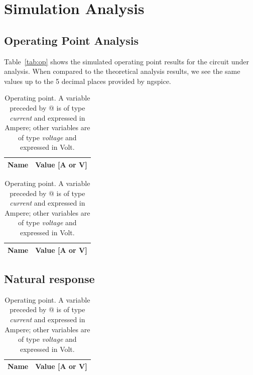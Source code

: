 \section{Simulation Analysis}
\label{sec:simulation}

\subsection{Operating Point Analysis}

Table~\ref{tab:op} shows the simulated operating point results for the circuit
under analysis. When compared to the theoretical analysis results, we see the same values
up to the 5 decimal places provided by ngspice.

\begin{table}[H]
  \centering
  \begin{tabular}{|l|r|}
    \hline    
    {\bf Name} & {\bf Value [A or V]} \\ \hline
    
  \end{tabular}
  \caption{Operating point. A variable preceded by @ is of type {\em current}
    and expressed in Ampere; other variables are of type {\it voltage} and expressed in
    Volt.}
  \label{tab:p1}
\end{table}

\begin{table}[H]
    \centering
    \begin{tabular}{|l|r|}
      \hline    
      {\bf Name} & {\bf Value [A or V]} \\ \hline
      
    \end{tabular}
    \caption{Operating point. A variable preceded by @ is of type {\em current}
      and expressed in Ampere; other variables are of type {\it voltage} and expressed in
      Volt.}
    \label{tab:p2}
  \end{table}

\subsection{Natural response}

  \begin{table}[H]
    \centering
    \begin{tabular}{|l|r|}
      \hline    
      {\bf Name} & {\bf Value [A or V]} \\ \hline
      
    \end{tabular}
    \caption{Operating point. A variable preceded by @ is of type {\em current}
      and expressed in Ampere; other variables are of type {\it voltage} and expressed in
      Volt.}
    \label{tab:p3}
  \end{table}

